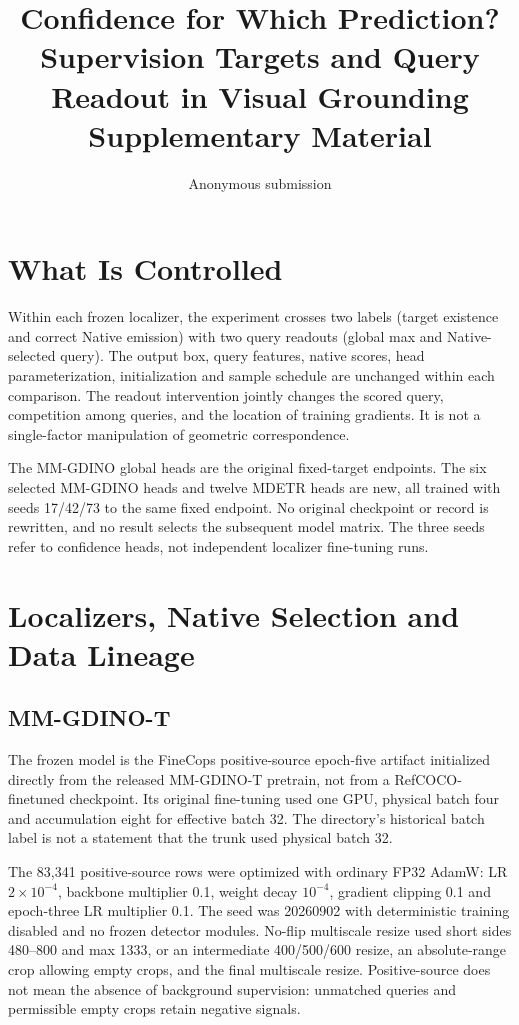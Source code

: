 \documentclass[10pt,twocolumn,letterpaper]{article}
\title{Confidence for Which Prediction?\\
Supervision Targets and Query Readout in Visual Grounding\\
Supplementary Material}
\author{Anonymous submission}
\begin{document}
\maketitle
\renewcommand{\thesection}{\Alph{section}}

\section{What Is Controlled}
Within each frozen localizer, the experiment crosses two labels
(target existence and correct Native emission) with two query readouts
(global max and Native-selected query). The output box, query features,
native scores, head parameterization, initialization and sample schedule
are unchanged within each comparison.
The readout intervention jointly changes the scored query, competition
among queries, and the location of training gradients. It is not a
single-factor manipulation of geometric correspondence.

The MM-GDINO global heads are the original fixed-target endpoints.
The six selected MM-GDINO heads and twelve MDETR heads are new, all
trained with seeds 17/42/73 to the same fixed endpoint. No original
checkpoint or record is rewritten, and no result selects the subsequent
model matrix. The three seeds refer to confidence heads, not independent
localizer fine-tuning runs.

\section{Localizers, Native Selection and Data Lineage}
\subsection{MM-GDINO-T}
The frozen model is the FineCops positive-source epoch-five artifact
initialized directly from the released MM-GDINO-T pretrain, not from a
RefCOCO-finetuned checkpoint. Its original fine-tuning used one GPU,
physical batch four and accumulation eight for effective batch 32.
The directory's historical batch label is not a statement that the
trunk used physical batch 32.

The 83,341 positive-source rows were optimized with ordinary FP32 AdamW:
LR $2\times10^{-4}$, backbone multiplier 0.1, weight decay $10^{-4}$,
gradient clipping 0.1 and epoch-three LR multiplier 0.1. The seed was
20260902 with deterministic training disabled and no frozen detector
modules. No-flip multiscale resize used short sides 480--800 and max 1333,
or an intermediate 400/500/600 resize, an absolute-range crop allowing
empty crops, and the final multiscale resize.
Positive-source does not mean the absence of background supervision:
unmatched queries and permissible empty crops retain negative signals.
\end{document}

